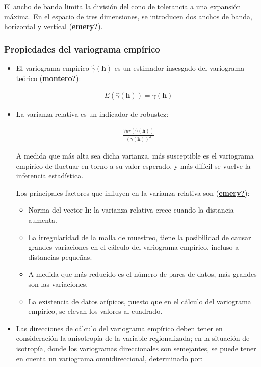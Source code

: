 \documentclass[
]{book}
\providecommand{\tightlist}{%
  \setlength{\itemsep}{0pt}\setlength{\parskip}{0pt}}
\begin{document}
El ancho de banda limita la división del cono de tolerancia a una expansión máxima. En el espacio de tres dimensiones, se introducen dos anchos de banda, horizontal y vertical (\protect\hyperlink{ref-emery}{\textbf{emery?}}).

\hypertarget{propiedades-del-variograma-empuxedrico}{%
\subsubsection*{Propiedades del variograma empírico}\label{propiedades-del-variograma-empuxedrico}}

\begin{itemize}
\item
  El variograma empírico \(\hat{\gamma}(\textbf{h})\) es un estimador insesgado del variograma teórico (\protect\hyperlink{ref-montero}{\textbf{montero?}}):

  \begin{align}
      E(\hat{\gamma}(\textbf{h}))=\gamma(\textbf{h})  
    \end{align}
\item
  La varianza relativa es un indicador de robustez:

  \begin{align}
      \frac{Var(\hat{\gamma}(\textbf{h}))}{(\gamma(\textbf{h}))^2}  
    \end{align}

  A medida que más alta sea dicha varianza, más susceptible es el variograma empírico de fluctuar en torno a su valor esperado, y más difícil se vuelve la inferencia estadística.

  Los principales factores que influyen en la varianza relativa son (\protect\hyperlink{ref-emery}{\textbf{emery?}}):

  \begin{itemize}
  \tightlist
  \item
    Norma del vector \(\textbf{h}\): la varianza relativa crece cuando la distancia aumenta.
  \item
    La irregularidad de la malla de muestreo, tiene la posibilidad de causar grandes variaciones en el cálculo del variograma empírico, incluso a distancias pequeñas.
  \item
    A medida que más reducido es el número de pares de datos, más grandes son las variaciones.
  \item
    La existencia de datos atípicos, puesto que en el cálculo del variograma empírico, se elevan los valores al cuadrado.
  \end{itemize}
\item
  Las direcciones de cálculo del variograma empírico deben tener en consideración la anisotropía de la variable regionalizada; en la situación de isotropía, donde los variogramas direccionales son semejantes, se puede tener en cuenta un variograma omnidireccional, determinado por:


\end{itemize}
\end{document}
